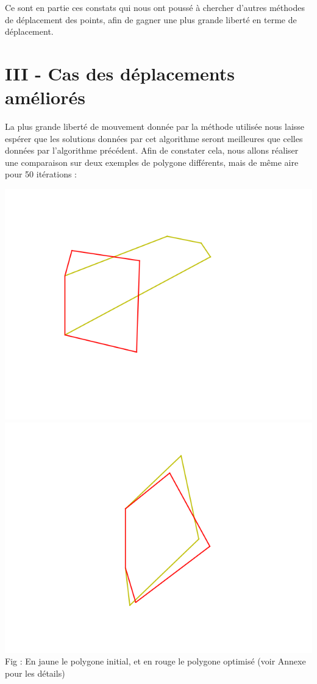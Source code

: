 \documentclass[a4paper,reqno]{article}
\newcommand{\pa}{\hspace{1cm}}
\begin{document}
\par Ce sont en partie ces constats qui nous ont poussé à chercher d'autres méthodes de déplacement des points, afin de gagner une plus grande liberté en terme de déplacement.\\
\newpage 

\section*{III - Cas des déplacements améliorés}

\pa La plus grande liberté de mouvement donnée par la méthode utilisée nous laisse espérer que les solutions données par cet algorithme seront meilleures que celles données par l'algorithme précédent. Afin de constater cela, nous allons réaliser une comparaison sur deux exemples de polygone différents, mais de même aire pour 50 itérations :  \\

\begin{center}

	\includegraphics[scale=0.45]{resultat_souple_2.png}
	\includegraphics[scale=0.45]{resultat_souple_4.png}\\
	Fig : En jaune le polygone initial, et en rouge le polygone optimisé (voir Annexe pour les détails)
\end{center}
\end{document}
